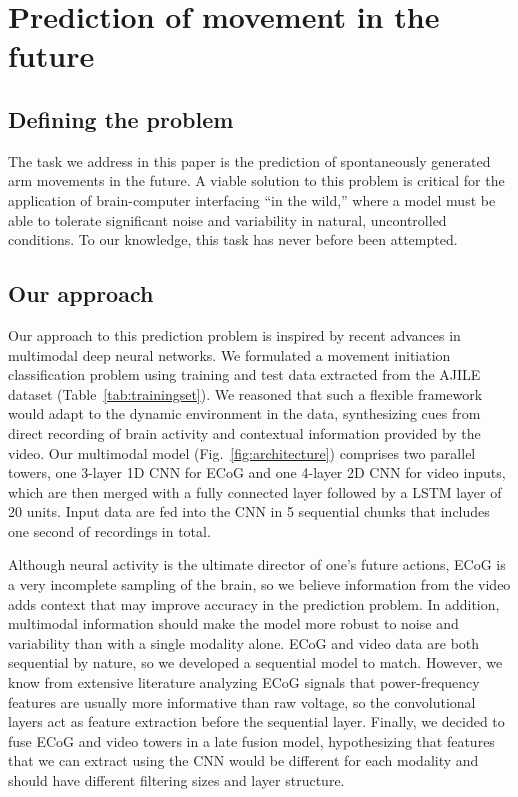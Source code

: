 \documentclass[letterpaper]{article} %
\begin{document}
\section{Prediction of movement in the future}
\subsection{Defining the problem}

The task we address in this paper is the prediction of spontaneously generated arm movements in the future.
A viable solution to this problem is critical for the application of brain-computer interfacing ``in the wild,'' where a model must be able to tolerate significant noise and variability in natural, uncontrolled conditions. 
To our knowledge, this task has never before been attempted.


\subsection{Our approach}

Our approach to this prediction problem is inspired by recent advances in multimodal deep neural networks.
We formulated a movement initiation classification problem using training and test data extracted from the AJILE dataset (Table~\ref{tab:trainingset}).
We reasoned that such a flexible framework would adapt to the dynamic environment in the data, synthesizing cues from direct recording of brain activity and contextual information provided by the video.
Our multimodal model (Fig.~\ref{fig:architecture}) comprises two parallel towers, one 3-layer 1D CNN for ECoG and one 4-layer 2D CNN for video inputs, which are then merged with a fully connected layer followed by a LSTM layer of 20 units.
Input data are fed into the CNN in 5 sequential chunks that includes one second of recordings in total. 

Although neural activity is the ultimate director of one's future actions, ECoG is a very incomplete sampling of the brain, so we believe information from the video adds context that may improve accuracy in the prediction problem.
In addition, multimodal information should make the model more robust to noise and variability than with a single modality alone. 
ECoG and video data are both sequential by nature, so we developed a sequential model to match. 
However, we know from extensive literature analyzing ECoG signals that power-frequency features are usually more informative than raw voltage, so the convolutional layers act as feature extraction before the sequential layer.
Finally, we decided to fuse ECoG and video towers in a late fusion model, hypothesizing that features that we can extract using the CNN would be different for each modality and should have different filtering sizes and layer structure. 
\end{document}
